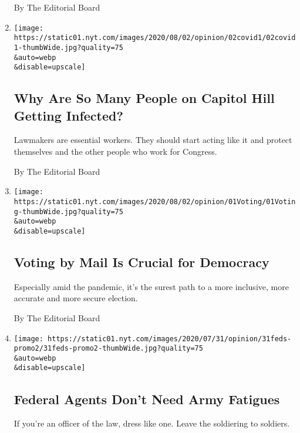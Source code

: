 \begin{enumerate}
  By The Editorial Board
\item
  \href{/2020/08/02/opinion/coronavirus-gohmert-congress-testing.html}{}

  \texttt{[image: https://static01.nyt.com/images/2020/08/02/opinion/02covid1/02covid1-thumbWide.jpg?quality=75\\\&auto=webp\\\&disable=upscale]}

  \hypertarget{why-are-so-many-people-on-capitol-hill-getting-infected}{%
  \subsection{Why Are So Many People on Capitol Hill Getting
  Infected?}\label{why-are-so-many-people-on-capitol-hill-getting-infected}}

  Lawmakers are essential workers. They should start acting like it and
  protect themselves and the other people who work for Congress.

  By The Editorial Board
\item
  \href{/2020/08/01/opinion/sunday/mail-voting-covid-2020-election.html}{}

  \texttt{[image: https://static01.nyt.com/images/2020/08/02/opinion/01Voting/01Voting-thumbWide.jpg?quality=75\\\&auto=webp\\\&disable=upscale]}

  \hypertarget{voting-by-mail-is-crucial-for-democracy}{%
  \subsection{Voting by Mail Is Crucial for
  Democracy}\label{voting-by-mail-is-crucial-for-democracy}}

  Especially amid the pandemic, it's the surest path to a more
  inclusive, more accurate and more secure election.

  By The Editorial Board
\item
  \href{/2020/07/31/opinion/federal-agents-trump-uniforms.html}{}

  \texttt{[image: https://static01.nyt.com/images/2020/07/31/opinion/31feds-promo2/31feds-promo2-thumbWide.jpg?quality=75\\\&auto=webp\\\&disable=upscale]}

  \hypertarget{federal-agents-dont-need-army-fatigues}{%
  \subsection{Federal Agents Don't Need Army
  Fatigues}\label{federal-agents-dont-need-army-fatigues}}

  If you're an officer of the law, dress like one. Leave the soldiering
  to soldiers.


\end{enumerate}

